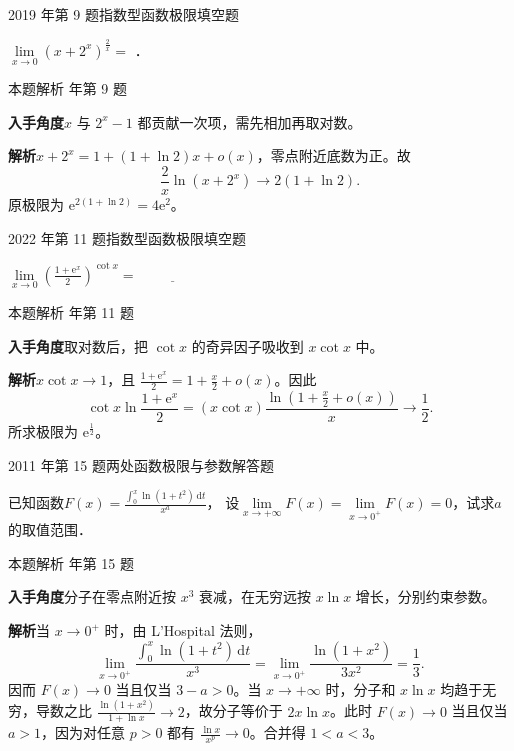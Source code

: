 \documentclass[UTF8,zihao=-4,fontset=fandol]{ctexart}
\renewcommand{\lim}{\operatorname*{lim}\limits}
\newcommand{\blank}{\underline{\hspace{5em}}}
\newcommand{\QuestionPage}[6]{%
  \par\noindent\begin{minipage}{\linewidth}
  \raggedright
  {\small\textcolor{black!60}{#3\quad #5}\hfill\textcolor{accent}{#2}}\par\smallskip}
\newcommand{\QuestionEnd}{\end{minipage}\par\medskip}
\newcommand{\QuestionPage}[6]{%
  \clearpage
  {\small\textcolor{accent}{#1\hfill #2}}\par\medskip
  {\small\textcolor{black!60}{#3\quad #5\hfill #6}}\par\vspace{9bp}}
\newcommand{\QuestionEnd}{}
\newenvironment{QuestionSolution}[1]{%
  \clearpage
  {\small\textcolor{black!60}{本题解析\quad #1}}\par\medskip
}{\par\clearpage}
\begin{document}
\QuestionPage{1.3 函数的极限}{填空题}{2019 年第 9 题}{1}{指数型函数极限}{014 / 234}
$\lim_{x \to 0} \left(x + 2^x \right)^{\frac{2}{x}} =$ \blank{}．
\QuestionEnd

\begin{QuestionSolution}{2019 年第 9 题}
\textbf{入手角度}\quad \(x\) 与 \(2^x-1\) 都贡献一次项，需先相加再取对数。

\textbf{解析}\quad \(x+2^x=1+(1+\ln 2)x+o(x)\)，零点附近底数为正。故
\[
\frac{2}{x}\ln(x+2^x)\longrightarrow2(1+\ln 2).
\]
原极限为 \(\mathrm{e}^{2(1+\ln 2)}=\boxed{4\mathrm{e}^2}\)。
\end{QuestionSolution}

\QuestionPage{1.3 函数的极限}{填空题}{2022 年第 11 题}{2}{指数型函数极限}{015 / 234}
\(\lim_{x \to 0} \left( \frac{1 + \mathrm{e}^{x}}{2} \right)^{\cot x} = \blank{}\)
\QuestionEnd

\begin{QuestionSolution}{2022 年第 11 题}
\textbf{入手角度}\quad 取对数后，把 \(\cot x\) 的奇异因子吸收到 \(x\cot x\) 中。

\textbf{解析}\quad \(x\cot x\to1\)，且 \(\frac{1+\mathrm{e}^x}{2}=1+\frac{x}{2}+o(x)\)。因此
\[
\cot x\ln\frac{1+\mathrm{e}^x}{2}
=(x\cot x)\frac{\ln(1+\frac{x}{2}+o(x))}{x}\longrightarrow\frac12.
\]
所求极限为 \(\boxed{\mathrm{e}^{\frac{1}{2}}}\)。
\end{QuestionSolution}

\QuestionPage{1.3 函数的极限}{解答题}{2011 年第 15 题}{2}{两处函数极限与参数}{016 / 234}
已知函数$F(x) = \frac{\int_0^x \ln(1 + t^2)\,\mathrm{d} t}{x^a}$，
设$\!\!\lim_{x \to +\infty}\!\!\! F(x) = \!\lim_{x \to 0^+}\! F(x) = 0$，试求$a$的取值范围．
\QuestionEnd

\begin{QuestionSolution}{2011 年第 15 题}
\textbf{入手角度}\quad 分子在零点附近按 \(x^3\) 衰减，在无穷远按 \(x\ln x\) 增长，分别约束参数。

\textbf{解析}\quad 当 \(x\to0^+\) 时，由 L'Hospital 法则，
\[
\lim_{x\to0^+}\frac{\int_0^x\ln(1+t^2)\,\mathrm{d}t}{x^3}
=\lim_{x\to0^+}\frac{\ln(1+x^2)}{3x^2}=\frac13.
\]
因而 \(F(x)\to0\) 当且仅当 \(3-a>0\)。当 \(x\to+\infty\) 时，分子和 \(x\ln x\) 均趋于无穷，导数之比 \(\frac{\ln(1+x^2)}{1+\ln x}\to2\)，故分子等价于 \(2x\ln x\)。此时 \(F(x)\to0\) 当且仅当 \(a>1\)，因为对任意 \(p>0\) 都有 \(\frac{\ln x}{x^p}\to0\)。合并得 \(\boxed{1<a<3}\)。
\end{QuestionSolution}
\end{document}
